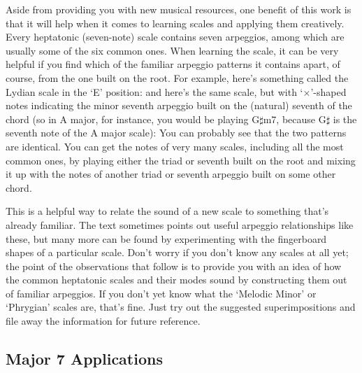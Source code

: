 \documentclass[english]{./gbook}
\begin{document}
\begin{large}
Aside from providing you with new musical resources, one benefit of this work is that it will help when it comes to learning scales and applying them creatively. Every heptatonic (seven-note) scale contains seven arpeggios, among which are usually some of the six common ones. When learning the scale, it can be very helpful if you find which of the familiar arpeggio patterns it contains apart, of course, from the one built on the root. For example, here's something called the Lydian scale in the `E' position:
and here's the same scale, but with `$\times$'-shaped notes indicating the minor seventh arpeggio built on the (natural) seventh of the chord (so in A major, for instance, you would be playing G$\sharp$m7, because G$\sharp$ is the seventh note of the A major scale):
You can probably see that the two patterns are identical. You can get the notes of very many scales, including all the most common ones, by playing either the triad or seventh built on the root and mixing it up with the notes of another triad or seventh arpeggio built on some other chord.

This is a helpful way to relate the sound of a new scale to something that's already familiar. The text sometimes points out useful arpeggio relationships like these, but many more can be found by experimenting with the fingerboard shapes of a particular scale. Don't worry if you don't know any scales at all yet; the point of the observations that follow is to provide you with an idea of how the common heptatonic scales and their modes sound by constructing them out of familiar arpeggios. If you don't yet know what the `Melodic Minor' or `Phrygian' scales are, that's fine. Just try out the suggested superimpositions and file away the information for future reference.

\subsection*{Major 7 Applications}


\end{large}
\end{document}
